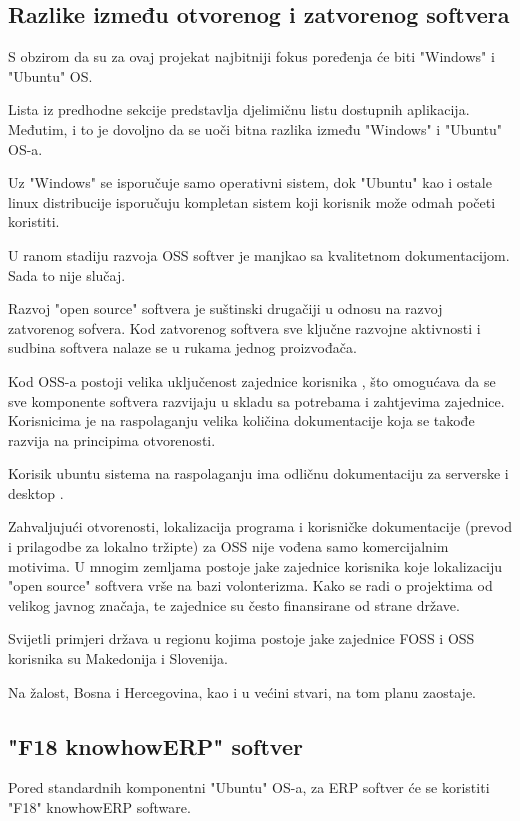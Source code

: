 \documentclass[times, utf8, seminar]{fit}
\begin{document}
 
\subsection{Razlike između otvorenog i zatvorenog softvera} 

S obzirom da su za ovaj projekat najbitniji fokus poređenja će biti "Windows" i "Ubuntu" OS. 

Lista iz predhodne sekcije predstavlja djelimičnu listu dostupnih aplikacija. Međutim, i to je dovoljno da se uoči bitna razlika između "Windows" i "Ubuntu" OS-a. 

Uz "Windows" se isporučuje samo operativni sistem, dok "Ubuntu" kao i ostale linux distribucije isporučuju kompletan sistem koji korisnik može odmah početi koristiti.

U ranom stadiju razvoja OSS softver je manjkao sa kvalitetnom dokumentacijom. Sada to nije slučaj. 

Razvoj "open source" softvera je suštinski drugačiji u odnosu na razvoj zatvorenog sofvera. Kod zatvorenog softvera sve ključne razvojne aktivnosti i sudbina softvera nalaze se u rukama jednog proizvođača.

Kod OSS-a postoji velika uključenost zajednice korisnika , što omogućava da se sve komponente softvera razvijaju u skladu sa potrebama i zahtjevima zajednice. Korisnicima je na raspolaganju velika količina dokumentacije koja se takođe razvija na principima otvorenosti.

Korisik ubuntu sistema na raspolaganju ima odličnu dokumentaciju za serverske \cite{ubuntudesktop} i desktop \cite{ubuntuserver}.

Zahvaljujući otvorenosti, lokalizacija programa i korisničke dokumentacije (prevod i prilagodbe za lokalno tržipte) za OSS nije vođena samo komercijalnim motivima. U mnogim zemljama postoje jake zajednice korisnika koje lokalizaciju "open source" softvera vrše na bazi volonterizma. Kako se radi o projektima od velikog javnog značaja, te zajednice su često finansirane od strane države.

Svijetli primjeri država u regionu kojima postoje jake zajednice FOSS  i OSS  korisnika su Makedonija i Slovenija.

Na žalost, Bosna i Hercegovina, kao i u većini stvari, na tom planu zaostaje. 

\subsection{"F18 knowhowERP" softver}
Pored standardnih komponentni "Ubuntu" OS-a, za ERP softver će se koristiti "F18" knowhowERP software.
\end{document}

